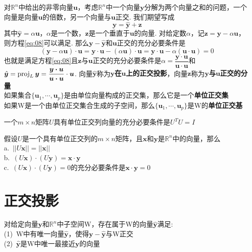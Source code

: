 对$\mathbb{R}^n$中给出的非零向量$\bm{u}$，考虑$\mathbb{R}^n$中一个向量$\bm{y}$分解为两个向量之和的问题，一个向量是向量$\bm{u}$的倍数，另一个向量与$\bm{u}$正交. 我们期望写成
\begin{equation}
\bm{y}=\hat{\bm{y}}+\bm{z}\label{eq:08}
\end{equation}
其中$\hat{\bm{y}}=\alpha\bm{u}$，$\alpha$是一个数，$\bm{z}$是一个垂直于$\bm{u}$的向量. 对给定数$\alpha$，记$\bm{z}=\bm{y}-\alpha\bm{u}$，则方程\eqref{eq:08}可以满足. 那么$\bm{y}-\hat{\bm{y}}$和$\bm{u}$正交的充分必要条件是
\[(\bm{y}-\alpha\bm{u})\cdot\bm{u}=\bm{y\cdot u}-(\alpha\bm{u})\cdot\bm{u}=\bm{y\cdot u}-\alpha(\bm{u\cdot u})=0\]
也就是满足方程\eqref{eq:08}且$\bm{z}$与$\bm{u}$正交的充分必要条件是$\alpha=\dfrac{\bm{y\cdot u}}{\bm{u\cdot u}}$和$\hat{\bm{y}}=\operatorname{proj}_L\bm{y}=\dfrac{\bm{y\cdot u}}{\bm{u\cdot u}}\cdot\bm{u}$. 向量$\hat{\bm{y}}$称为\textbf{$\bm{y}$在$\bm{u}$上的正交投影}，向量$\bm{z}$称为\textbf{$\bm{y}$与$\bm{u}$正交的分量}\\[2ex]

如果集合$\{\bm{u}_1,\cdots,\bm{u}_p\}$是由单位向量构成的正交集，那么它是一个\textbf{单位正交集}\\[1ex]

如果W是一个由单位正交集合生成的子空间，那么$\{\bm{u}_1,\cdots,\bm{u}_p\}$是W的\textbf{单位正交基}\\[2ex]

\begin{TheoremOne}
一个$m\times n$矩阵$U$具有单位正交列向量的充分必要条件是$U^TU=I$
\end{TheoremOne}\vspace{4ex}

\begin{TheoremOne}
假设$U$是一个具有单位正交列的$m\times n$矩阵，且$\bm{x}$和$\bm{y}$是$\mathbb{R}^n$中的向量，那么\\
a.\ $||U\bm{x}||=||\bm{x}||$\\
b.\ $(U\bm{x})\cdot(U\bm{y})=\bm{x\cdot y}$\\
c.\ $(U\bm{x})\cdot(U\bm{y})=0$的充分必要条件是$\bm{x}\cdot\bm{y}=0$
\end{TheoremOne}\vspace{4ex}

\section{正交投影}
对给定向量$\bm{y}$和$\mathbb{R}^n$中子空间W，存在属于W的向量$\hat{\bm{y}}$满足:\\
(1)\ W中有唯一向量$\hat{\bm{y}}$，使得$\bm{y}-\hat{\bm{y}}$与W正交\\
(2)\ $\hat{\bm{y}}$是W中唯一最接近$\bm{y}$的向量\\[2ex]

